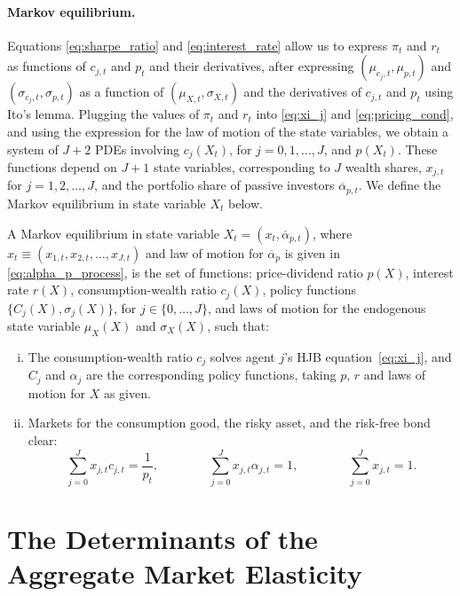 \paragraph{Markov equilibrium.}
Equations \eqref{eq:sharpe_ratio} and \eqref{eq:interest_rate} allow us to express $\pi_{t}$ and $r_t$ as functions of $c_{j,t}$ and $p_t$ and their derivatives, after expressing $(\mu_{c_j,t}, \mu_{p,t})$ and $(\sigma_{c_j,t},\sigma_{p,t})$ as a function of $(\mu_{X,t}, \sigma_{X,t})$ and the derivatives of $c_{j,t}$ and $p_t$ using Ito's lemma. Plugging the values of $\pi_t$ and $r_t$ into \eqref{eq:xi_j} and \eqref{eq:pricing_cond}, and using the expression for the law of motion of the state variables, we obtain a system of $J+2$ PDEs involving $c_{j}(X_t)$, for $j = 0,1,\ldots, J$, and $p(X_t)$. These functions depend on $J+1$ state variables, corresponding to $J$ wealth shares, $x_{j,t}$ for $j = 1,2,\ldots,J $, and the portfolio share of passive investors $\overline{\alpha}_{p,t}$.
We define the Markov equilibrium in state variable $X_t$ below.
\begin{defn}
A Markov equilibrium in state variable $X_t=\left(x_t, \overline{\alpha}_{p,t}\right)$, where $x_{t} \equiv\left(x_{1, t}, x_{2, t}, \ldots, x_{J, t}\right)$ and law of motion for $\overline{\alpha}_p$ is given in \eqref{eq:alpha_p_process}, is the set of functions: price-dividend ratio $p(X)$, interest rate $r(X)$, consumption-wealth ratio $c_j(X)$, policy functions $\{C_j(X), \sigma_j(X)\}$, for $j\in\{0,\ldots,J\}$, and laws of motion for the endogenous state variable $\mu_X(X)$ and $\sigma_X(X)$, such that:
\begin{enumerate}[(i)]
    \item The consumption-wealth ratio $c_j$ solves agent $j$'s HJB equation~\eqref{eq:xi_j}, and $C_j$ and $\alpha_j$ are the corresponding policy functions, taking $p$, $r$ and laws of motion for $X$ as given.
    \item Markets for the consumption good, the risky asset, and the risk-free bond clear:
    \begin{equation}
        \sum_{j=0}^{J} x_{j, t} c_{j, t}=\frac{1}{p_t}, \qquad \qquad
    \sum_{j=0}^{J} x_{j, t} \alpha_{j, t}=1,\qquad \qquad
    \sum_{j=0}^{J} x_{j, t}=1.\label{eq:mkt-clearing}
    \end{equation}
\end{enumerate}
\end{defn}

\section{The Determinants of the Aggregate Market Elasticity}\label{sec:elasticity}

